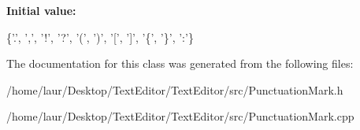 {\bfseries Initial value\+:}
\begin{DoxyCode}
\{\textcolor{charliteral}{'.'}, \textcolor{charliteral}{','}, \textcolor{charliteral}{'!'}, \textcolor{charliteral}{'?'}, \textcolor{charliteral}{'('}, \textcolor{charliteral}{')'},
                                                \textcolor{charliteral}{'['}, \textcolor{charliteral}{']'}, \textcolor{charliteral}{'\{'}, \textcolor{charliteral}{'\}'}, \textcolor{charliteral}{':'}\}
\end{DoxyCode}


The documentation for this class was generated from the following files\+:\begin{DoxyCompactItemize}
\item 
/home/laur/\+Desktop/\+Text\+Editor/\+Text\+Editor/src/Punctuation\+Mark.\+h\item 
/home/laur/\+Desktop/\+Text\+Editor/\+Text\+Editor/src/Punctuation\+Mark.\+cpp\end{DoxyCompactItemize}
